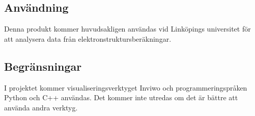 \subsection{Användning}
Denna produkt kommer huvudsakligen användas vid Linköpings universitet för att analysera data från elektronstruktursberäkningar.

\subsection{Begränsningar}
I projektet kommer visualiseringsverktyget Inviwo och programmeringspråken Python och C++ användas. Det kommer inte utredas om det är bättre att använda andra verktyg.

